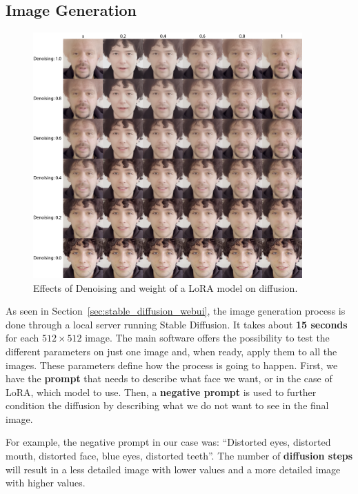 \documentclass[sn-mathphys,Numbered]{sn-jnl}
\theoremstyle{thmstyleone}%
\theoremstyle{thmstyletwo}%
\theoremstyle{thmstylethree}%
\begin{document}
\subsection{Image Generation}

\begin{figure}[t]
	\centering
	\includegraphics[width=0.92\textwidth, keepaspectratio]{img/project_img/grid-santini.png}
	\caption{Effects of Denoising and weight of a LoRA model on diffusion.}
	\label{fig:grid-santini}
\end{figure}


As seen in Section~\ref{sec:stable_diffusion_webui}, the image generation process is done through 
a local server running Stable Diffusion.  It takes about \textbf{15 seconds} for each $512 \times 512$ image.  The main software offers the possibility to test the different parameters  on just one image and, when ready, apply them to all the images.  These parameters define how the process is going to happen.
First, we have the \textbf{prompt} that needs to describe what face we want, or in the case of LoRA, 
which model to use.
Then, a \textbf{negative prompt} is used to further condition the diffusion by  describing what we do not want to see in the final image. 

For example, the negative prompt in our case was: ``Distorted eyes, distorted mouth, distorted face, blue eyes, distorted teeth''. The number of \textbf{diffusion steps} will result in a less detailed image with lower values and  a more detailed image with higher values. 
\end{document}
